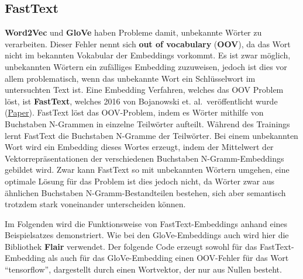 \documentclass[11pt]{article}
\begin{document}
    \hypertarget{fasttext}{%
\subsection{FastText}\label{fasttext}}

\textbf{Word2Vec} und \textbf{GloVe} haben Probleme damit, unbekannte
Wörter zu verarbeiten. Dieser Fehler nennt sich \textbf{out of
vocabulary} (\textbf{OOV}), da das Wort nicht im bekannten Vokabular der
Embeddings vorkommt. Es ist zwar möglich, unbekannten Wörtern ein
zufälliges Embedding zuzuweisen, jedoch ist dies vor allem
problematisch, wenn das unbekannte Wort ein Schlüsselwort im
untersuchten Text ist. Eine Embedding Verfahren, welches das OOV Problem
löst, ist \textbf{FastText}, welches 2016 von Bojanowski et.
al.~veröffentlicht wurde
(\href{https://arxiv.org/abs/1607.04606}{Paper}). FastText löst das
OOV-Problem, indem es Wörter mithilfe von Buchstaben N-Grammen in
einzelne Teilwörter aufteilt. Während des Trainings lernt FastText die
Buchstaben N-Gramme der Teilwörter. Bei einem unbekannten Wort wird ein
Embedding dieses Wortes erzeugt, indem der Mittelwert der
Vektorrepräsentationen der verschiedenen Buchstaben N-Gramm-Embeddings
gebildet wird. Zwar kann FastText so mit unbekannten Wörtern umgehen,
eine optimale Lösung für das Problem ist dies jedoch nicht, da Wörter
zwar aus ähnlichen Buchstaben N-Gramm-Bestandteilen bestehen, sich aber
semantisch trotzdem stark voneinander unterscheiden können.

Im Folgenden wird die Funktionsweise von FastText-Embeddings anhand
eines Beispielsatzes demonstriert. Wie bei den GloVe-Embeddings auch
wird hier die Bibliothek \textbf{Flair} verwendet. Der folgende Code
erzeugt sowohl für das FastText-Embedding als auch für das
GloVe-Embedding einen OOV-Fehler für das Wort ``tensorflow'',
dargestellt durch einen Wortvektor, der nur aus Nullen besteht.
\end{document}
